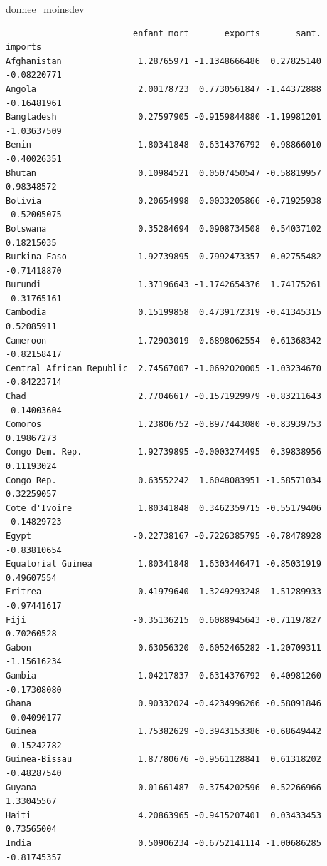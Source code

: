 \documentclass[
]{article}
\newenvironment{Shaded}{}{}
\newcommand{\NormalTok}[1]{#1}
\begin{document}
\begin{Shaded}
\begin{Highlighting}[]
\NormalTok{donnee\_moinsdev}
\end{Highlighting}
\end{Shaded}

\begin{verbatim}
                         enfant_mort       exports       sant.     imports
Afghanistan               1.28765971 -1.1348666486  0.27825140 -0.08220771
Angola                    2.00178723  0.7730561847 -1.44372888 -0.16481961
Bangladesh                0.27597905 -0.9159844880 -1.19981201 -1.03637509
Benin                     1.80341848 -0.6314376792 -0.98866010 -0.40026351
Bhutan                    0.10984521  0.0507450547 -0.58819957  0.98348572
Bolivia                   0.20654998  0.0033205866 -0.71925938 -0.52005075
Botswana                  0.35284694  0.0908734508  0.54037102  0.18215035
Burkina Faso              1.92739895 -0.7992473357 -0.02755482 -0.71418870
Burundi                   1.37196643 -1.1742654376  1.74175261 -0.31765161
Cambodia                  0.15199858  0.4739172319 -0.41345315  0.52085911
Cameroon                  1.72903019 -0.6898062554 -0.61368342 -0.82158417
Central African Republic  2.74567007 -1.0692020005 -1.03234670 -0.84223714
Chad                      2.77046617 -0.1571929979 -0.83211643 -0.14003604
Comoros                   1.23806752 -0.8977443080 -0.83939753  0.19867273
Congo Dem. Rep.           1.92739895 -0.0003274495  0.39838956  0.11193024
Congo Rep.                0.63552242  1.6048083951 -1.58571034  0.32259057
Cote d'Ivoire             1.80341848  0.3462359715 -0.55179406 -0.14829723
Egypt                    -0.22738167 -0.7226385795 -0.78478928 -0.83810654
Equatorial Guinea         1.80341848  1.6303446471 -0.85031919  0.49607554
Eritrea                   0.41979640 -1.3249293248 -1.51289933 -0.97441617
Fiji                     -0.35136215  0.6088945643 -0.71197827  0.70260528
Gabon                     0.63056320  0.6052465282 -1.20709311 -1.15616234
Gambia                    1.04217837 -0.6314376792 -0.40981260 -0.17308080
Ghana                     0.90332024 -0.4234996266 -0.58091846 -0.04090177
Guinea                    1.75382629 -0.3943153386 -0.68649442 -0.15242782
Guinea-Bissau             1.87780676 -0.9561128841  0.61318202 -0.48287540
Guyana                   -0.01661487  0.3754202596 -0.52266966  1.33045567
Haiti                     4.20863965 -0.9415207401  0.03433453  0.73565004
India                     0.50906234 -0.6752141114 -1.00686285 -0.81745357

\end{verbatim}
\end{document}
